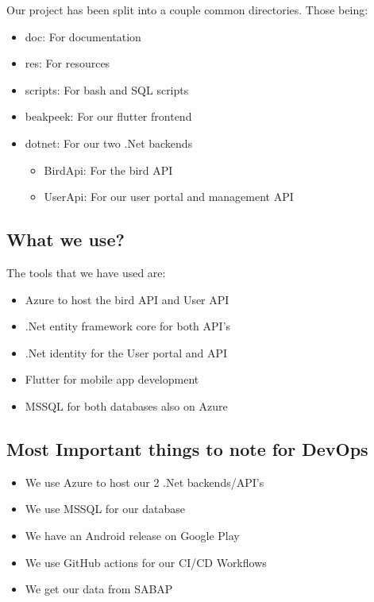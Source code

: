 \documentclass[a4paper]{article}
\begin{document}
Our project has been split into a couple common directories. 
Those being:
\begin{itemize}
    \item doc: For documentation
    \item res: For resources
    \item scripts: For bash and SQL scripts
    \item beakpeek: For our flutter frontend
    \item dotnet: For our two .Net backends
        \begin{itemize}
            \item BirdApi: For the bird API 
            \item UserApi: For our user portal and management API 
        \end{itemize}
\end{itemize}

\subsection{What we use?}
The tools that we have used are:
\begin{itemize}
    \item Azure to host the bird API and User API
    \item .Net entity framework core for both API's
    \item .Net identity for the User portal and API
    \item Flutter for mobile app development
    \item MSSQL for both databases also on Azure
\end{itemize}

\subsection{Most Important things to note for DevOps}

\begin{itemize}
    \item We use Azure to host our 2 .Net backends/API's
    \item We use MSSQL for our database
    \item We have an Android release on Google Play
    \item We use GitHub actions for our CI/CD Workflows
    \item We get our data from SABAP
\end{itemize}
\end{document}
